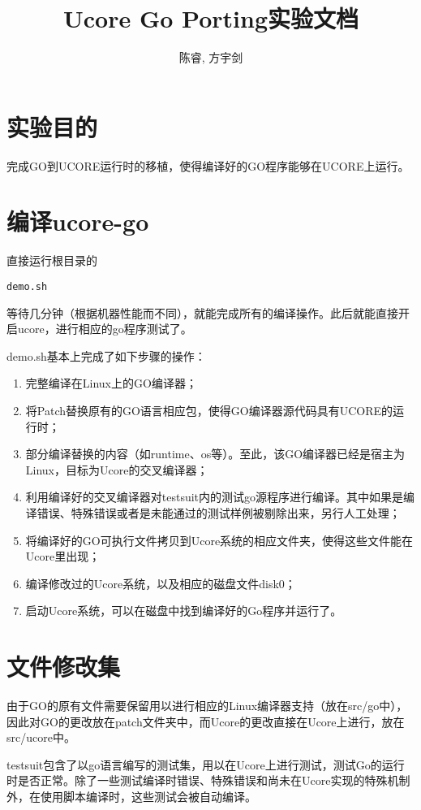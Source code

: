 \documentclass{article}
\begin{document}

\author{陈睿, 方宇剑}
\title{Ucore Go Porting实验文档}
\maketitle

\section{实验目的}
完成GO到UCORE运行时的移植，使得编译好的GO程序能够在UCORE上运行。

\section{编译ucore-go}
直接运行根目录的
\begin{lstlisting}
demo.sh
\end{lstlisting}
等待几分钟（根据机器性能而不同），就能完成所有的编译操作。此后就能直接开启ucore，进行相应的go程序测试了。

demo.sh基本上完成了如下步骤的操作：
\begin{enumerate}
  \item 完整编译在Linux上的GO编译器；
  \item 将Patch替换原有的GO语言相应包，使得GO编译器源代码具有UCORE的运行时；
  \item 部分编译替换的内容（如runtime、os等）。至此，该GO编译器已经是宿主为Linux，目标为Ucore的交叉编译器；
  \item 利用编译好的交叉编译器对testsuit内的测试go源程序进行编译。其中如果是编译错误、特殊错误或者是未能通过的测试样例被剔除出来，另行人工处理；
  \item 将编译好的GO可执行文件拷贝到Ucore系统的相应文件夹，使得这些文件能在Ucore里出现；
  \item 编译修改过的Ucore系统，以及相应的磁盘文件disk0；
  \item 启动Ucore系统，可以在磁盘中找到编译好的Go程序并运行了。
\end{enumerate}

\section{文件修改集}
由于GO的原有文件需要保留用以进行相应的Linux编译器支持（放在src/go中），因此对GO的更改放在patch文件夹中，而Ucore的更改直接在Ucore上进行，放在src/ucore中。

testsuit包含了以go语言编写的测试集，用以在Ucore上进行测试，测试Go的运行时是否正常。除了一些测试编译时错误、特殊错误和尚未在Ucore实现的特殊机制外，在使用脚本编译时，这些测试会被自动编译。
\end{document}
